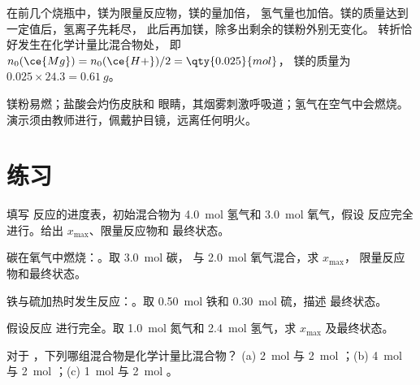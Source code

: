 \begin{remark}[读懂平台段]\label{rem:g10:reaction-progress-table:plateau}
在前几个烧瓶中，镁为限量反应物，镁的量加倍，
氢气量也加倍。镁的质量达到一定值后，氢离子先耗尽，
此后再加镁，除多出剩余的镁粉外别无变化。
转折恰好发生在化学计量比混合物处，
即 $n_0(\ce{Mg}) = n_0(\ce{H+})/2 = \qty{0.025}{mol}$，
镁的质量为 $0.025 \times 24.3 = \qty{0.61}{g}$。
\end{remark}

\begin{safety}{}
镁粉易燃；盐酸会灼伤皮肤和
眼睛，其烟雾刺激呼吸道；氢气在空气中会燃烧。
演示须由教师进行，佩戴护目镜，远离任何明火。
\end{safety}

\section{练习}

\begin{exercise}[$\star$]\label{exo:g10:reaction-progress-table:1}
填写  反应的进度表，初始混合物为
\qty{4.0}{mol} 氢气和 \qty{3.0}{mol} 氧气，假设
反应完全进行。给出 $x_{\max}$、限量反应物和
最终状态。
\end{exercise}

\begin{exercise}[$\star$]\label{exo:g10:reaction-progress-table:2}
碳在氧气中燃烧：。取 \qty{3.0}{mol} 碳，
与 \qty{2.0}{mol} 氧气混合，求 $x_{\max}$，
限量反应物和最终状态。
\end{exercise}

\begin{exercise}[$\star$]\label{exo:g10:reaction-progress-table:3}
铁与硫加热时发生反应：。取
\qty{0.50}{mol} 铁和 \qty{0.30}{mol} 硫，描述
最终状态。
\end{exercise}

\begin{exercise}[$\star$]\label{exo:g10:reaction-progress-table:4}
假设反应  进行完全。取
\qty{1.0}{mol} 氮气和 \qty{2.4}{mol} 氢气，求
$x_{\max}$ 及最终状态。
\end{exercise}

\begin{exercise}[$\star$]\label{exo:g10:reaction-progress-table:5}
对于 ，下列哪组混合物是化学计量比混合物？
(a) \qty{2}{mol}  与 \qty{2}{mol} ；(b) \qty{4}{mol}
 与 \qty{2}{mol} ；(c) \qty{1}{mol}  与
\qty{2}{mol} 。
\end{exercise}


